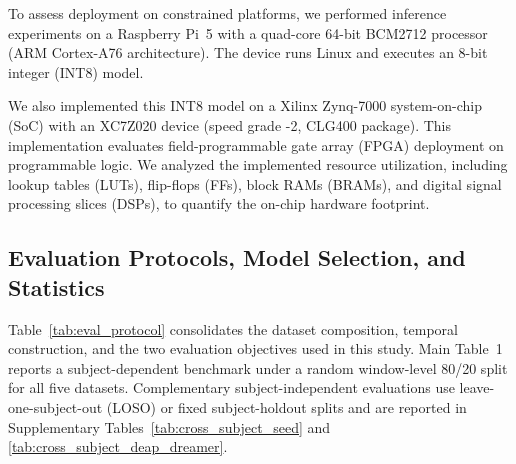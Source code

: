 ﻿\documentclass[12pt]{article}
\begin{document}
To assess deployment on constrained platforms, we performed inference experiments on a Raspberry Pi~5 with a quad-core 64-bit BCM2712 processor (ARM Cortex-A76 architecture). The device runs Linux and executes an 8-bit integer (INT8) model.

We also implemented this INT8 model on a Xilinx Zynq-7000 system-on-chip (SoC) with an XC7Z020 device (speed grade -2, CLG400 package). This implementation evaluates field-programmable gate array (FPGA) deployment on programmable logic. We analyzed the implemented resource utilization, including lookup tables (LUTs), flip-flops (FFs), block RAMs (BRAMs), and digital signal processing slices (DSPs), to quantify the on-chip hardware footprint.

\subsection{Evaluation Protocols, Model Selection, and Statistics}\label{supp:evaluation_protocols}

Table~\ref{tab:eval_protocol} consolidates the dataset composition, temporal construction, and the two evaluation objectives used in this study. Main Table~1 reports a subject-dependent benchmark under a random window-level 80/20 split for all five datasets. Complementary subject-independent evaluations use leave-one-subject-out (LOSO) or fixed subject-holdout splits and are reported in Supplementary Tables~\ref{tab:cross_subject_seed} and \ref{tab:cross_subject_deap_dreamer}.

\begin{table}[h]
\centering
\caption{Dataset composition and evaluation protocols. The ``4/4/1'', ``9/9/1.5'', and ``9/9/1'' entries denote outer-window duration/stride/PSE-bin length in seconds.}
\label{tab:eval_protocol}
\scriptsize
\renewcommand{\arraystretch}{1.25}
\setlength{\tabcolsep}{3pt}
\end{table}
\end{document}
